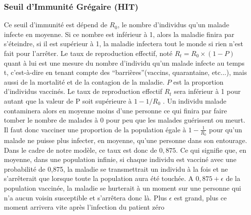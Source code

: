 \documentclass[journal, a4paper]{IEEEtran}
\begin{document}
	\subsubsection{Seuil d'Immunité Grégaire (HIT)}
	Ce seuil d'immunité est dépend de $R_0$, le nombre d'individus qu'un malade infecte en moyenne. Si ce nombre est inférieur à 1, alors la maladie finira par s'éteindre, si il est supérieur à 1, la maladie infectera tout le monde si rien n'est fait pour l'arrêter.
	Le taux de reproduction effectif, noté $R_t = R_0 \times (1-P)$ quant à lui est une mesure du nombre d'individu qu'un malade infecte au temps t, c'est-à-dire en tenant compte des ``barrières''(vaccins, quarantaine, etc...), mais aussi de la mortalité et de la contagion de la maladie. $P$ est la proportion d'individus vaccinés. Le taux de reproduction effectif $R_t$ sera inférieur à 1 pour autant que la valeur de P soit supérieure à $1-1/R_0$ \cite{herd_guide}. Un individu malade contaminera alors en moyenne moins d'une personne ce qui finira par faire tomber le nombre de malades à 0 pour peu que les malades guérissent ou meurt. Il faut donc vacciner une proportion de la population égale à $1-\frac{1}{R_0}$ pour qu'un malade ne puisse plus infecter, en moyenne, qu'une personne dans son entourage.\\
	Dans le cadre de notre modèle, ce taux est donc de $0,875$. Ce qui signifie que, en moyenne, dans une population infinie, si chaque individu est vacciné avec une probabilité de 0,875, la maladie se transmettrait un individu à la fois et ne s'arrêterait que lorsque toute la population aura été touchée. A $0,875+\epsilon$ de la population vaccinée, la maladie se hurterait à un moment sur une personne qui n'a aucun voisin susceptible et s'arrêtera donc là. Plus $\epsilon$ est grand, plus ce moment arrivera vite après l'infection du patient zéro



\end{document}
